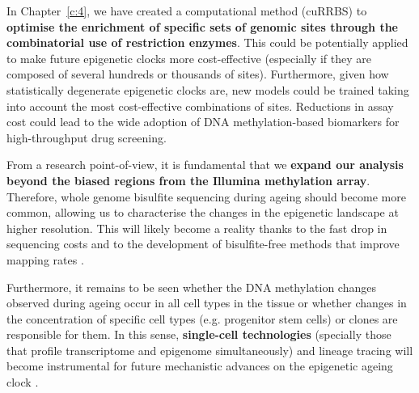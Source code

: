 \smallskip

In Chapter~\ref{c:4}, we have created a computational method (cuRRBS) to \textbf{optimise the enrichment of specific sets of genomic sites through the combinatorial use of restriction enzymes}. This could be potentially applied to make future epigenetic clocks more cost-effective (especially if they are composed of several hundreds or thousands of sites). Furthermore, given how statistically degenerate epigenetic clocks are, new models could be trained taking into account the most cost-effective combinations of sites. Reductions in assay cost could lead to the wide adoption of DNA methylation-based biomarkers for high-throughput drug screening.

\bigskip

From a research point-of-view, it is fundamental that we \textbf{expand our analysis beyond the biased regions from the Illumina methylation array}. Therefore, whole genome bisulfite sequencing during ageing should become more common, allowing us to characterise the changes in the epigenetic landscape at higher resolution. This will likely become a reality thanks to the fast drop in sequencing costs and to the development of bisulfite-free methods that improve mapping rates \cite{Liu2019}. 

\bigskip

Furthermore, it remains to be seen whether the DNA methylation changes observed during ageing occur in all cell types in the tissue or whether changes in the concentration of specific cell types (e.g. progenitor stem cells) or clones are responsible for them. In this sense, \textbf{single-cell technologies} (specially those that profile  transcriptome and epigenome simultaneously) and lineage tracing will become instrumental for future mechanistic advances on the epigenetic ageing clock \cite{Kelsey2017}.